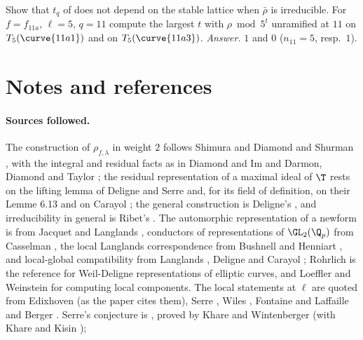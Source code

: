 \begin{exercise}\label{exer:modgalrep:tamagawa-lattice}
Show that $t_q$ of  does not depend on the stable lattice when $\bar\rho$ is irreducible. For $f=f_{11a}$, $\ell=5$, $q=11$ compute the largest $t$ with
$\rho\bmod5^t$ unramified at $11$ on $T_5(\curve{11a1})$ and on $T_5(\curve{11a3})$. \emph{Answer.} $1$ and $0$ ($n_{11}=5$, resp.\ $1$).
\end{exercise}

\section{Notes and references}\label{sec:modgalrep:notes}

\paragraph{Sources followed.} The construction of $\rho_{f,\lambda}$ in weight $2$ follows Shimura \cite[Chapter 7]{Shimura71} and Diamond and Shurman
\cite[Chapter 9]{DiamondShurman}, with the integral and residual facts as in Diamond and Im \cite{DiamondIm} and Darmon, Diamond and Taylor
\cite{DDT}; the residual representation of a maximal ideal of $\T$ rests on the lifting lemma of Deligne and Serre \cite[Lemme 6.11]{DeligneSerre74} and, for its field of
definition, on their Lemme 6.13 and on Carayol \cite{Carayol94}; the general construction is Deligne's \cite{Deligne}, and irreducibility in general is Ribet's \cite{Ribet77}. The automorphic representation
of a newform is from Jacquet and Langlands \cite{JacquetLanglands70}, conductors of representations of $\GL_2(\Q_p)$ from Casselman \cite{Casselman73}, the local Langlands
correspondence from Bushnell and Henniart \cite{BushnellHenniart06}, and local-global compatibility from Langlands \cite{Langlands73}, Deligne
\cite{Deligne73} and Carayol \cite{Carayol86}; Rohrlich \cite{Rohrlich94} is the reference for Weil-Deligne representations of elliptic curves, and
Loeffler and Weinstein \cite{LoefflerWeinstein12} for computing local components. The local statements at $\ell$ are quoted from Edixhoven
\cite[Section 2]{Edixhoven92} (as the paper cites them), Serre \cite{Serre72, Serre87}, Wiles \cite{Wiles88}, Fontaine and Laffaille \cite{FontaineLaffaille} and
Berger \cite{Berger}. Serre's conjecture is \cite{Serre87}, proved by Khare and Wintenberger \cite{KhareWintenberger} (with Khare \cite{Khare} and Kisin \cite{Kisin09});

